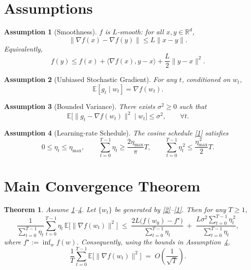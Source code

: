 \documentclass{article}
\newtheorem{theorem}{Theorem}
\newtheorem{assumption}{Assumption}
\begin{document}
\section*{Assumptions}
\begin{assumption}[Smoothness]\label{asm:smooth}
$f$ is $L$‑smooth: for all $x,y\in\mathbb{R}^d$,
\[
\|\nabla f(x)-\nabla f(y)\|\le L\|x-y\|.
\]
Equivalently,
\[
f(y)\le f(x)+\langle\nabla f(x),y-x\rangle+\frac{L}{2}\|y-x\|^2 .
\]
\end{assumption}

\begin{assumption}[Unbiased Stochastic Gradient]\label{asm:unbiased}
For any $t$, conditioned on $w_t$,
\[
\mathbb{E}[g_t\mid w_t]=\nabla f(w_t).
\]
\end{assumption}

\begin{assumption}[Bounded Variance]\label{asm:variance}
There exists $\sigma^2\ge0$ such that
\[
\mathbb{E}\bigl[\|g_t-\nabla f(w_t)\|^2\mid w_t\bigr]\le\sigma^2,
\qquad\forall t.
\]
\end{assumption}

\begin{assumption}[Learning‑rate Schedule]\label{asm:schedule}
The cosine schedule \eqref{1} satisfies
\[
0\le\eta_t\le\eta_{\max},\qquad
\sum_{t=0}^{T-1}\eta_t\ge \frac{2\eta_{\max}}{\pi}T,\qquad
\sum_{t=0}^{T-1}\eta_t^{\,2}\le \frac{\eta_{\max}^{\,2}}{2}T .
\]
\end{assumption}

\section*{Main Convergence Theorem}
\begin{theorem}\label{thm:sgdr}
Assume \ref{asm:smooth}–\ref{asm:schedule}.  Let $\{w_t\}$ be generated by
\eqref{2}–\eqref{1}.  Then for any $T\ge1$,
\[
\frac{1}{\sum_{t=0}^{T-1}\eta_t}
\sum_{t=0}^{T-1}\eta_t\,
\mathbb{E}\bigl[\|\nabla f(w_t)\|^2\bigr]
\;\le\;
\frac{2L\bigl(f(w_0)-f^\star\bigr)}{\sum_{t=0}^{T-1}\eta_t}
\;+\;
\frac{L\sigma^2\sum_{t=0}^{T-1}\eta_t^{\,2}}{\sum_{t=0}^{T-1}\eta_t},
\tag{3}
\]
where $f^\star:=\inf_{w}f(w)$.  Consequently, using the bounds in
Assumption~\ref{asm:schedule},
\[
\frac{1}{T}\sum_{t=0}^{T-1}\mathbb{E}\bigl[\|\nabla f(w_t)\|^2\bigr]
\;=\;O\!\left(\frac{1}{\sqrt{T}}\right).
\]
\end{theorem}
\end{document}
